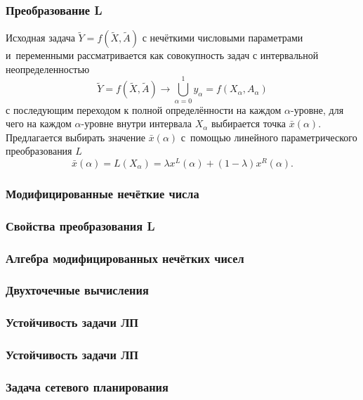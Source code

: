 \documentclass[12pt]{beamer}
\begin{document}
\begin{frame}
  \frametitle{Преобразование L}
  Исходная задача $\tilde{Y}=f\left( \tilde{X}, \tilde A \right)$ с нечёткими числовыми параметрами и~переменными рассматривается как совокупность задач с интервальной неопределенностью
  \begin{equation}
  \label{eq:alpha-equivalence}
  	\tilde{Y} = f\left( \tilde X, \tilde A \right)\to \bigcup\limits_{\alpha =0}^{1}{y_\alpha}=f\left( X_\alpha, A_\alpha \right)
  \end{equation}
  с последующим переходом к полной определённости на каждом $\alpha$-уровне, для чего на каждом $\alpha$-уровне внутри интервала $X_\alpha$ выбирается точка $\bar{x}\left( \alpha  \right)$. Предлагается выбирать значение $\bar{x}\left( \alpha  \right)$ с~помощью линейного параметрического преобразования $L$
  \begin{equation}
    \label{eq:L-transform-base}
    \bar{x}\left( \alpha  \right)=L\left( X_\alpha \right)=\lambda x^L \left( \alpha  \right)+\left( 1-\lambda  \right) x^R \left( \alpha  \right).
  \end{equation}
\end{frame}

\begin{frame}
  \frametitle{Модифицированные нечёткие числа}
  
\end{frame}

\begin{frame}
  \frametitle{Свойства преобразования L}
\end{frame}

\begin{frame}
  \frametitle{Алгебра модифицированных нечётких чисел}
\end{frame}

\begin{frame}
  \frametitle{Двухточечные вычисления}
\end{frame}

\begin{frame}
  \frametitle{Устойчивость задачи ЛП}
\end{frame}

\begin{frame}
  \frametitle{Устойчивость задачи ЛП}
\end{frame}

\begin{frame}
  \frametitle{Задача сетевого планирования}
\end{frame}
\end{document}

